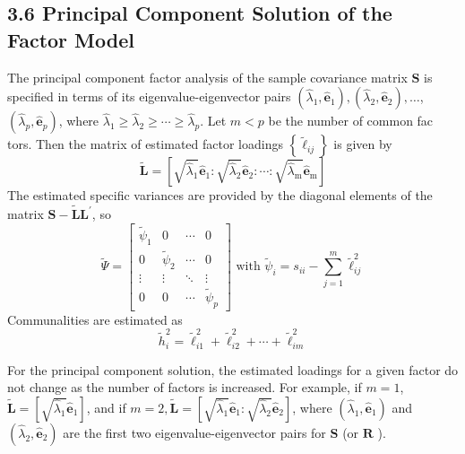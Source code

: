 \documentclass[12pt]{article}
\begin{document}
\subsection*{3.6 Principal Component Solution of the Factor Model}

The principal component factor analysis of the sample covariance matrix $\mathbf{S}$ is specified in terms of its eigenvalue-eigenvector pairs $\left(\hat{\lambda}_1, \hat{\mathbf{e}}_1\right),\left(\hat{\lambda}_2, \hat{\mathbf{e}}_2\right), \ldots$, $\left(\hat{\lambda}_p, \hat{\mathbf{e}}_p\right)$, where $\hat{\lambda}_1 \geq \hat{\lambda}_2 \geq \cdots \geq \hat{\lambda}_p$. Let $m<p$ be the number of common fac tors. Then the matrix of estimated factor loadings $\left\{\tilde{\ell}_{i j}\right\}$ is given by
\begin{equation}
	\tilde{\mathbf{L}}=\left[\sqrt{\hat{\lambda}_1} \hat{\mathbf{e}}_1: \sqrt{\hat{\lambda}_2} \hat{\mathbf{e}}_2: \cdots: \sqrt{\hat{\lambda}_{\mathrm{m}}} \hat{\mathbf{e}}_{\mathrm{m}}\right]
\end{equation}
The estimated specific variances are provided by the diagonal elements of the matrix $\mathbf{S}-\widetilde{\mathbf{L}} \mathbf{L}^{\prime}$, so
\begin{equation}
	\widetilde{\Psi}=\left[\begin{array}{cccc}
		\widetilde{\psi}_1 & 0 & \cdots & 0 \\
		0 & \widetilde{\psi}_2 & \cdots & 0 \\
		\vdots & \vdots & \ddots & \vdots \\
		0 & 0 & \cdots & \widetilde{\psi}_p
	\end{array}\right] \text { with } \widetilde{\psi}_i=s_{i i}-\sum_{j=1}^m \tilde{\ell}_{i j}^2
\end{equation}
Communalities are estimated as
\begin{equation}
	\widetilde{h}_i^2=\tilde{\ell}_{i 1}^2+\tilde{\ell}_{i 2}^2+\cdots+\tilde{\ell}_{i m}^2
\end{equation}

\noindent For the principal component solution, the estimated loadings for a given factor do not change as the number of factors is increased. For example, if $m=1$, $\tilde{\mathbf{L}}=\left[\sqrt{\hat{\lambda}_1} \hat{\mathbf{e}}_1\right]$, and if $m=2, \tilde{\mathbf{L}}=\left[\sqrt{\hat{\lambda}_1} \hat{\mathbf{e}}_1: \sqrt{\hat{\lambda}_2} \hat{\mathbf{e}}_2\right]$, where $\left(\hat{\lambda}_1, \hat{\mathbf{e}}_1\right)$ and $\left(\hat{\lambda}_2, \hat{\mathbf{e}}_2\right)$ are the first two eigenvalue-eigenvector pairs for $\mathbf{S}$ (or $\mathbf{R}$ ).
\end{document}
